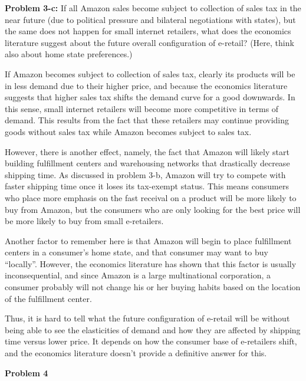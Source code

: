 \documentclass[psamsfonts]{amsart}
\newenvironment{sol}{\vspace{0.25cm}{\large \bfseries Solution:}}{\qedsymbol}
\newenvironment{prob}[1]{\begin{framed}{\large \bfseries Problem #1:}}{\end{framed}}
\begin{document}
\begin{prob}{3-c}
If all Amazon sales become subject to collection of sales tax in the near future (due to political pressure and bilateral negotiations with states), but the same does not happen for small internet retailers, what does the economics literature suggest about the future overall configuration of e-retail? (Here, think also about home state preferences.)
\end{prob}
\begin{sol}
If Amazon becomes subject to collection of sales tax, clearly its products will be in less demand due to their higher price, and because the economics literature suggests that higher sales tax shifts the demand curve for a good downwards. In this sense, small internet retailers will become more competitive in terms of demand. This results from the fact that these retailers may continue providing goods without sales tax while Amazon becomes subject to sales tax.

However, there is another effect, namely, the fact that Amazon will likely start building fulfillment centers and warehousing networks that drastically decrease shipping time. As discussed in problem 3-b, Amazon will try to compete with faster shipping time once it loses its tax-exempt status. This means consumers who place more emphasis on the fast receival on a product will be more likely to buy from Amazon, but the consumers who are only looking for the best price will be more likely to buy from small e-retailers. 

Another factor to remember here is that Amazon will begin to place fulfillment centers in a consumer's home state, and that consumer may want to buy ``locally''. However, the economics literature has shown that this factor is usually inconsequential, and since Amazon is a large multinational corporation, a consumer probably will not change his or her buying habits based on the location of the fulfillment center. 

Thus, it is hard to tell what the future configuration of e-retail will be without being able to see the elasticities of demand and how they are affected by shipping time versus lower price. It depends on how the consumer base of e-retailers shift, and the economics literature doesn't provide a definitive answer for this.
\end{sol}

\vspace{1cm}
\begin{center}
{\Large \bfseries Problem 4}
\end{center}
\end{document}
